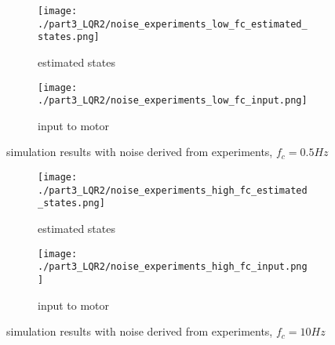\begin{figure}[H]
	\centering
	\begin{subfigure}[b]{0.45\textwidth}
		\texttt{[image: ./part3\_LQR2/noise\_experiments\_low\_fc\_estimated\_states.png]}
		\caption{estimated states}
	\end{subfigure}
	\begin{subfigure}[b]{0.45\textwidth}
		\texttt{[image: ./part3\_LQR2/noise\_experiments\_low\_fc\_input.png]}
		\caption{input to motor}
	\end{subfigure}
	\caption{simulation results with noise derived from experiments, $f_c=0.5Hz$}
	\label{fig:LQR2 simulation with real noise low noise}
\end{figure}

\begin{figure}[H]
	\centering
	\begin{subfigure}[b]{0.45\textwidth}
		\texttt{[image: ./part3\_LQR2/noise\_experiments\_high\_fc\_estimated\_states.png]}
		\caption{estimated states}
	\end{subfigure}
	\begin{subfigure}[b]{0.45\textwidth}
		\texttt{[image: ./part3\_LQR2/noise\_experiments\_high\_fc\_input.png]}
		\caption{input to motor}
	\end{subfigure}
	\caption{simulation results with noise derived from experiments, $f_c=10Hz$}
	\label{fig:LQR2 simulation with real noise high noise}
\end{figure}
